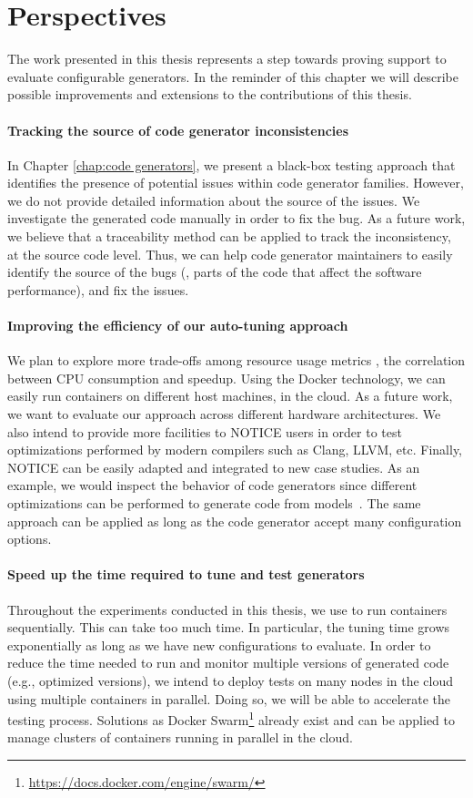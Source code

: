 \section{Perspectives}
The work presented in this thesis represents a step towards proving support to evaluate configurable generators. In the reminder of this chapter we will describe possible improvements and extensions to the contributions of this thesis.

\paragraph{Tracking the source of code generator inconsistencies} 
In Chapter \ref{chap:code generators}, we present a black-box testing approach that identifies the presence of potential issues within code generator families. However, we do not provide detailed information about the source of the issues. We investigate the generated code manually in order to fix the bug. As a future work, we believe that a traceability method can be applied to track the inconsistency, at the source code level. Thus, we can help code generator maintainers to easily identify the source of the bugs (\eg, parts of the code that affect the software performance), and fix the issues.

\paragraph{Improving the efficiency of our auto-tuning approach}
We plan to explore more trade-offs among resource usage metrics \eg, the correlation between CPU consumption and speedup. Using the Docker technology, we can easily run containers on different host machines, in the cloud. As a future work, we want to evaluate our approach across different hardware architectures.
We also intend to provide more facilities to NOTICE users in order to test optimizations performed by modern compilers such as Clang, LLVM, etc.
Finally, NOTICE can be easily adapted and integrated to new case studies. As an example, we would inspect the behavior of code generators since different optimizations can be performed to generate code from models~\cite{stuermer2007systematic}. The same approach can be applied as long as the code generator accept many configuration options.

\paragraph{Speed up the time required to tune and test generators}
Throughout the experiments conducted in this thesis, we use to run containers sequentially. This can take too much time. In particular, the tuning time grows exponentially as long as we have new configurations to evaluate. 
In order to reduce the time needed to run and monitor multiple versions of generated code (e.g., optimized versions), we intend to deploy tests on many nodes in the cloud using multiple containers in parallel. Doing so, we will be able to accelerate the testing process. Solutions as Docker Swarm\footnote{\url{https://docs.docker.com/engine/swarm/}} already exist and can be applied to manage clusters of containers running in parallel in the cloud.

